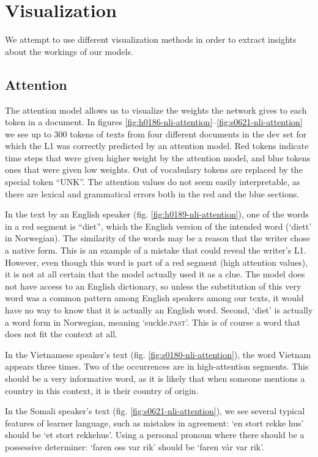\section{Visualization}

We attempt to use different visualization methods in order to extract
insights about the workings of our models.


\subsection{Attention}

The attention model allows us to visualize the weights the network gives to
each token in a document. In figures
\ref{fig:h0186-nli-attention}--\ref{fig:s0621-nli-attention} we see up to 300
tokens of texts from four different documents in the dev set for which the L1
was correctly predicted by an attention model. Red tokens indicate time steps
that were given higher weight by the attention model, and blue tokens ones
that were given low weights. Out of vocabulary tokens are replaced by the
special token ``UNK''. The attention values do not seem easily interpretable,
as there are lexical and grammatical errors both in the red and the blue
sections.

In the text by an English speaker (fig. \ref{fig:h0189-nli-attention}), one
of the words in a red segment is ``diet'', which the English version of the
intended word (`diett' in Norwegian). The similarity of the words may be a
reason that the writer chose a native form. This is an example of a mistake
that could reveal the writer's \ac{L1}. However, even though this word is
part of a red segment (high attention values), it is not at all certain that
the model actually used it as a clue. The model does not have access to an
English dictionary, so unless the substitution of this very word was a common
pattern among English speakers among our texts, it would have no way to know
that it is actually an English word. Second, `diet' is actually a word form
in Norwegian, meaning `suckle.\textsc{past}'. This is of course a word that
does not fit the context at all.

In the Vietnamese speaker's text (fig. \ref{fig:s0180-nli-attention}), the
word Vietnam appears three times. Two of the occurrences are in
high-attention segments. This should be a very informative word, as it is
likely that when someone mentions a country in this context, it is their
country of origin.

In the Somali speaker's text (fig. \ref{fig:s0621-nli-attention}), we see
several typical features of learner language, such as mistakes in agreement:
`en stort rekke hus' should be `et stort rekkehus'. Using a personal pronoun
where there should be a possessive determiner: `faren oss var rik' should be
`faren vår var rik'.


